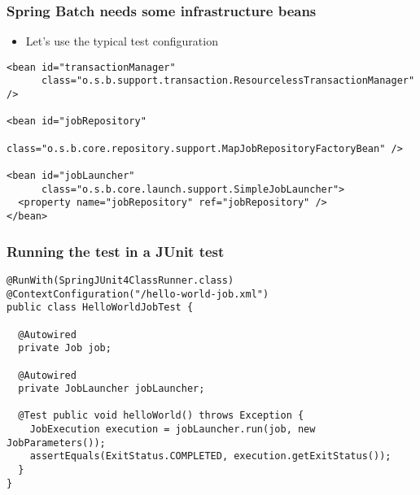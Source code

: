 \begin{frame}[fragile]
\frametitle{Spring Batch needs some infrastructure beans}
\begin{itemize}
 \item Let's use the typical test configuration
\end{itemize}

\lstset{language=XML}
\begin{lstlisting}
<bean id="transactionManager"
      class="o.s.b.support.transaction.ResourcelessTransactionManager" />

<bean id="jobRepository"   
      class="o.s.b.core.repository.support.MapJobRepositoryFactoryBean" />

<bean id="jobLauncher"
      class="o.s.b.core.launch.support.SimpleJobLauncher">
  <property name="jobRepository" ref="jobRepository" />
</bean>
\end{lstlisting}
\end{frame}

\begin{frame}[fragile]
\frametitle{Running the test in a JUnit test}

\lstset{language=Java}
\begin{lstlisting}
@RunWith(SpringJUnit4ClassRunner.class)
@ContextConfiguration("/hello-world-job.xml")
public class HelloWorldJobTest {

  @Autowired
  private Job job;

  @Autowired
  private JobLauncher jobLauncher;

  @Test public void helloWorld() throws Exception {
    JobExecution execution = jobLauncher.run(job, new JobParameters());
    assertEquals(ExitStatus.COMPLETED, execution.getExitStatus());
  }
}
\end{lstlisting}
\end{frame}
